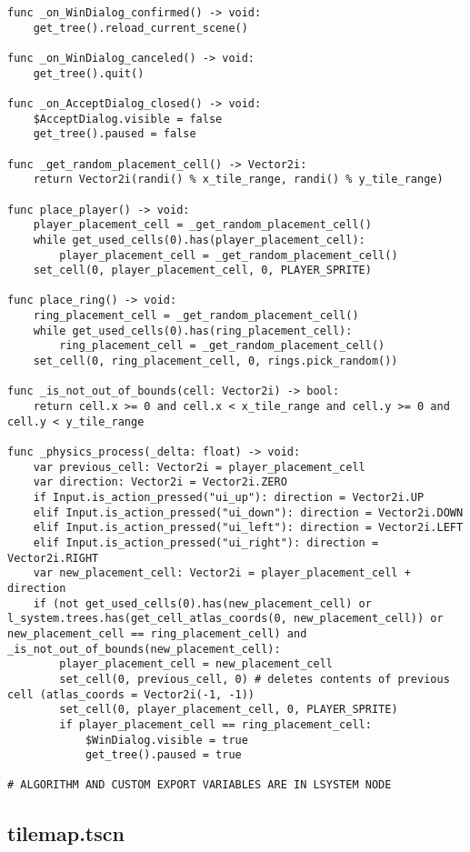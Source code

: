 \begin{lstlisting}
func _on_WinDialog_confirmed() -> void:
	get_tree().reload_current_scene()

func _on_WinDialog_canceled() -> void:
	get_tree().quit()

func _on_AcceptDialog_closed() -> void:
	$AcceptDialog.visible = false
	get_tree().paused = false

func _get_random_placement_cell() -> Vector2i:
	return Vector2i(randi() % x_tile_range, randi() % y_tile_range)

func place_player() -> void:
	player_placement_cell = _get_random_placement_cell()
	while get_used_cells(0).has(player_placement_cell):
		player_placement_cell = _get_random_placement_cell()
	set_cell(0, player_placement_cell, 0, PLAYER_SPRITE)

func place_ring() -> void:
	ring_placement_cell = _get_random_placement_cell()
	while get_used_cells(0).has(ring_placement_cell):
		ring_placement_cell = _get_random_placement_cell()
	set_cell(0, ring_placement_cell, 0, rings.pick_random())

func _is_not_out_of_bounds(cell: Vector2i) -> bool:
	return cell.x >= 0 and cell.x < x_tile_range and cell.y >= 0 and cell.y < y_tile_range

func _physics_process(_delta: float) -> void:
	var previous_cell: Vector2i = player_placement_cell
	var direction: Vector2i = Vector2i.ZERO
	if Input.is_action_pressed("ui_up"): direction = Vector2i.UP
	elif Input.is_action_pressed("ui_down"): direction = Vector2i.DOWN
	elif Input.is_action_pressed("ui_left"): direction = Vector2i.LEFT
	elif Input.is_action_pressed("ui_right"): direction = Vector2i.RIGHT
	var new_placement_cell: Vector2i = player_placement_cell + direction
	if (not get_used_cells(0).has(new_placement_cell) or l_system.trees.has(get_cell_atlas_coords(0, new_placement_cell)) or new_placement_cell == ring_placement_cell) and _is_not_out_of_bounds(new_placement_cell):
		player_placement_cell = new_placement_cell
		set_cell(0, previous_cell, 0) # deletes contents of previous cell (atlas_coords = Vector2i(-1, -1))
		set_cell(0, player_placement_cell, 0, PLAYER_SPRITE)
		if player_placement_cell == ring_placement_cell:
			$WinDialog.visible = true
			get_tree().paused = true

# ALGORITHM AND CUSTOM EXPORT VARIABLES ARE IN LSYSTEM NODE
\end{lstlisting}

\subsection{tile\textunderscore{}map.tscn}

